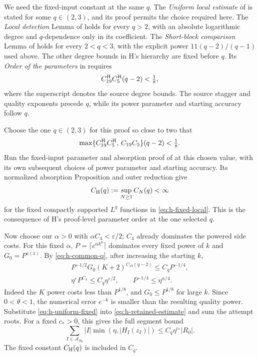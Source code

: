We need the fixed-input constant at the same \(q\).
The \emph{Uniform local estimate} of \cite[Section~2]{H} is
stated for some \(q\in(2,3)\), and its proof permits the choice
required here.  The \emph{Local detection} Lemma of
\cite[Section~4]{H} holds for every \(q>2\), with an absolute
logarithmic degree and \(q\)-dependence only in its coefficient.
The \emph{Short-block comparison} Lemma of
\cite[Section~7]{H} holds for every \(2<q<3\), with the explicit
power \(11(q-2)/(q-1)\) used above.  The other degree bounds in
H's hierarchy are fixed before \(q\).  Its
\emph{Order of the parameters} in \cite[Section~10]{H} requires
\[
 C_{19}^{\rm H}C_5^{\rm H}(q-2)<\tfrac18,
\]
where the superscript denotes the source degree bounds.
The source stagger and quality exponents precede \(q\), while
its power parameter and starting accuracy follow \(q\).

Choose the one \(q\in(2,3)\) for this proof so close to two that
\begin{equation}
 \max\{C_{19}^{\rm H}C_5^{\rm H},\,C_{19}C_5\}(q-2)<\tfrac18.
 \label{eq:h-common-q}
\end{equation}
Run the fixed-input parameter and absorption proof of
\cite[Sections~2 and~10]{H} at this chosen value, with its own
subsequent choices of power parameter and starting accuracy.
Its normalized absorption Proposition and outer reduction give
\begin{equation}
 C_{\rm H}(q):=\sup_{N\ge1}C_N(q)<\infty
 \label{eq:h-uniform-fixed}
\end{equation}
for the fixed compactly supported \(L^q\) functions in
\eqref{eq:h-fixed-local}.  This is the consequence of H's
proof-level parameter order at the one selected \(q\).

Now choose our \(\alpha>0\) with
\(\alpha C_4<\varepsilon/2\); \(C_4\) already dominates the
powered side costs.  For this fixed \(\alpha\),
\(P=\lceil e^{\alpha k^\theta}\rceil\) dominates every fixed
power of \(k\) and \(G_0=P^{o(1)}\).  By
\eqref{eq:h-common-q}, after increasing the starting \(k\),
\[
 \begin{gathered}
 P^{-1/2}G_0(K+2)^{C_{19}(q-2)}\le C_qP^{-1/4},\\
 \eta^\varepsilon P^{C_4}\le C_q\eta^{\varepsilon/2},
 \qquad P^{-1/4}\le\eta^{\alpha/4}.
 \end{gathered}
\]
Indeed the \(K\) power costs less than \(P^{1/8}\), and
\(G_0\le P^{1/8}\) for large \(k\).  Since \(0<\theta<1\),
the numerical error \(e^{-k}\) is smaller than the resulting
quality power.  Substitute \eqref{eq:h-uniform-fixed} into
\eqref{eq:h-retained-estimate} and sum the attempt roots.
For a fixed \(c_*>0\), this gives the full segment bound
\begin{equation}
 \sum_{I\in\mathcal A_{R_0}}|I|
       \min(\eta,|H_I(z_I)|)
 \le C_q\eta^{c_*}|R_0|.
 \label{eq:h-quality-gain}
\end{equation}
The fixed constant \(C_{\rm H}(q)\) is included in \(C_q\).

